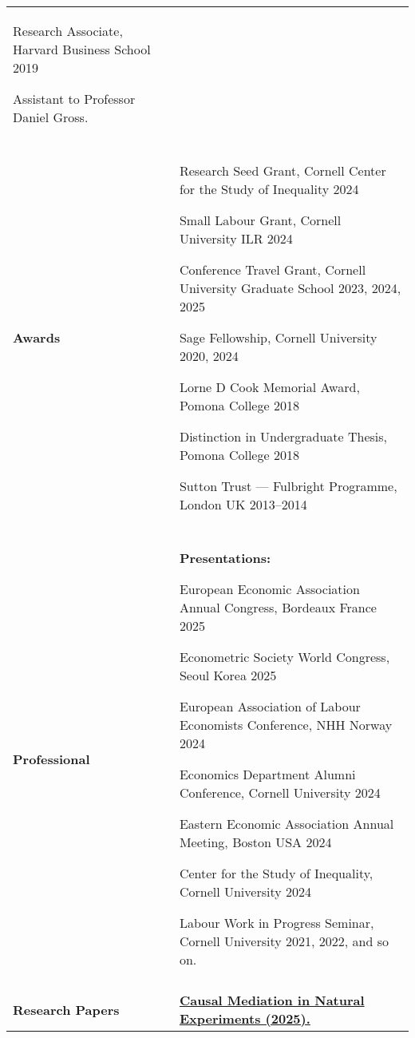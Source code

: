 \documentclass[letterpaper,11pt,oneside]{article}
\begin{document}
\begin{longtable}[\textwidth]{p{} p{}}
    Research Associate, Harvard Business School \hfill 2019

    \indent\hspace{1cm} Assistant to Professor Daniel Gross. \\ \\

\textbf{Awards}
    & Research Seed Grant, Cornell Center for the Study of Inequality \hfill 2024
    
    Small Labour Grant, Cornell University ILR \hfill 2024
    
    Conference Travel Grant, Cornell University Graduate School \hfill 2023, 2024, 2025
    
    Sage Fellowship, Cornell University \hfill 2020, 2024
    
    Lorne D Cook Memorial Award, Pomona College \hfill 2018
    
    Distinction in Undergraduate Thesis, Pomona College \hfill 2018
    
    Sutton Trust --- Fulbright Programme, London UK \hfill 2013--2014 \\ \\

\textbf{Professional}
    & \textbf{Presentations:}

    European Economic Association Annual Congress, Bordeaux France \hfill 2025

    Econometric Society World Congress, Seoul Korea \hfill 2025

    European Association of Labour Economists Conference, NHH Norway \hfill 2024

    Economics Department Alumni Conference, Cornell University \hfill 2024

    Eastern Economic Association Annual Meeting, Boston USA \hfill 2024

    Center for the Study of Inequality, Cornell University \hfill 2024

    Labour Work in Progress Seminar, Cornell University \hfill 2021, 2022, and so on. \\ \\

\textbf{Research Papers}
    & \textbf{\href{https://raw.githubusercontent.com/shoganhennessy/mediation-natural-experiment/main/mediation-natural-experiment-2025.pdf}{
        Causal Mediation in Natural Experiments (2025).}}


\end{longtable}
\end{document}
